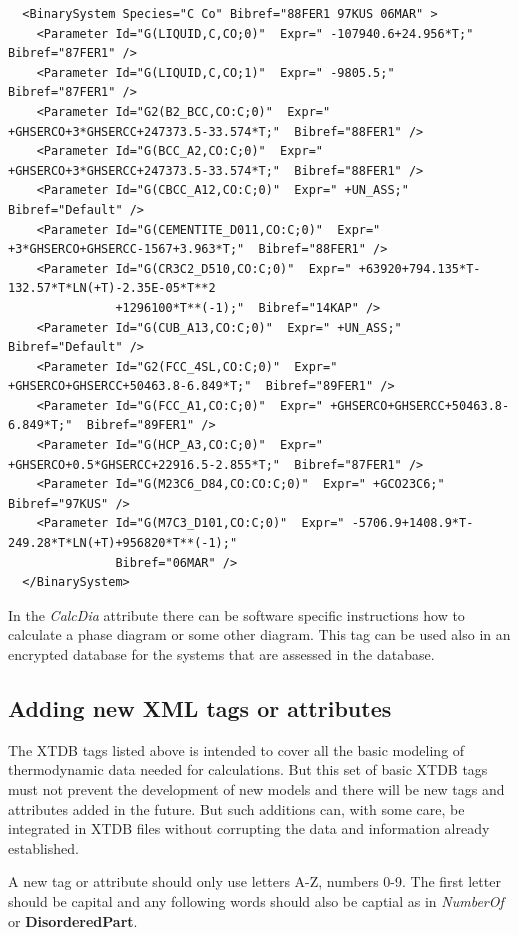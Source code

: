 \documentclass{article}
\begin{document}
{\begin{verbatim}
  <BinarySystem Species="C Co" Bibref="88FER1 97KUS 06MAR" >
    <Parameter Id="G(LIQUID,C,CO;0)"  Expr=" -107940.6+24.956*T;"  Bibref="87FER1" />
    <Parameter Id="G(LIQUID,C,CO;1)"  Expr=" -9805.5;"  Bibref="87FER1" />
    <Parameter Id="G2(B2_BCC,CO:C;0)"  Expr=" +GHSERCO+3*GHSERCC+247373.5-33.574*T;"  Bibref="88FER1" />
    <Parameter Id="G(BCC_A2,CO:C;0)"  Expr=" +GHSERCO+3*GHSERCC+247373.5-33.574*T;"  Bibref="88FER1" />
    <Parameter Id="G(CBCC_A12,CO:C;0)"  Expr=" +UN_ASS;"  Bibref="Default" />
    <Parameter Id="G(CEMENTITE_D011,CO:C;0)"  Expr=" +3*GHSERCO+GHSERCC-1567+3.963*T;"  Bibref="88FER1" />
    <Parameter Id="G(CR3C2_D510,CO:C;0)"  Expr=" +63920+794.135*T-132.57*T*LN(+T)-2.35E-05*T**2
               +1296100*T**(-1);"  Bibref="14KAP" />
    <Parameter Id="G(CUB_A13,CO:C;0)"  Expr=" +UN_ASS;"  Bibref="Default" />
    <Parameter Id="G2(FCC_4SL,CO:C;0)"  Expr=" +GHSERCO+GHSERCC+50463.8-6.849*T;"  Bibref="89FER1" />
    <Parameter Id="G(FCC_A1,CO:C;0)"  Expr=" +GHSERCO+GHSERCC+50463.8-6.849*T;"  Bibref="89FER1" />
    <Parameter Id="G(HCP_A3,CO:C;0)"  Expr=" +GHSERCO+0.5*GHSERCC+22916.5-2.855*T;"  Bibref="87FER1" />
    <Parameter Id="G(M23C6_D84,CO:CO:C;0)"  Expr=" +GCO23C6;"  Bibref="97KUS" />
    <Parameter Id="G(M7C3_D101,CO:C;0)"  Expr=" -5706.9+1408.9*T-249.28*T*LN(+T)+956820*T**(-1);"
               Bibref="06MAR" />
  </BinarySystem>
\end{verbatim}
}

In the {\em CalcDia} attribute there can be software specific
instructions how to calculate a phase diagram or some other diagram.
This tag can be used also in an encrypted database for the systems
that are assessed in the database.

\newpage

\subsection{Adding new XML tags or attributes}

The XTDB tags listed above is intended to cover all the basic modeling
of thermodynamic data needed for calculations.  But this set of basic
XTDB tags must not prevent the development of new models and there
will be new tags and attributes added in the future.  But such
additions can, with some care, be integrated in XTDB files without
corrupting the data and information already established.

A new tag or attribute should only use letters A-Z, numbers 0-9.  The
first letter should be capital and any following words should also be
captial as in {\em NumberOf} or {\bf DisorderedPart}.
\end{document}
